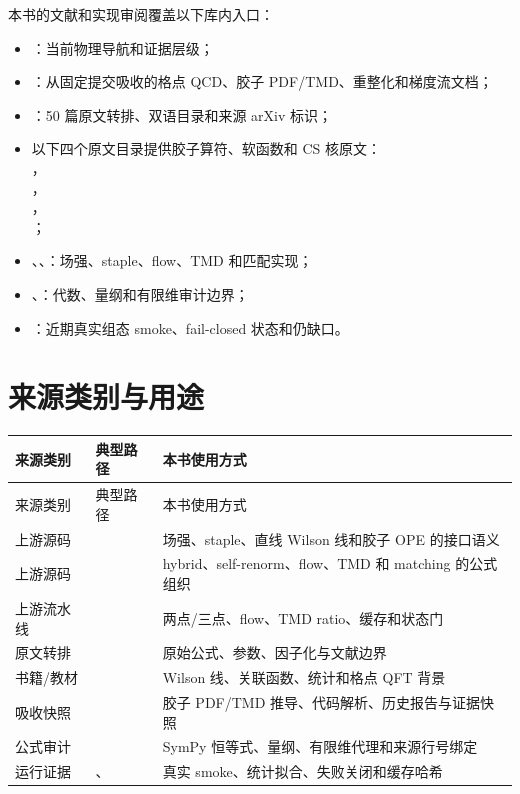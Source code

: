 \documentclass[UTF8,12pt,a4paper,twoside,openany]{ctexbook}
\begin{document}
本书的文献和实现审阅覆盖以下库内入口：
\begin{itemize}
  \item {}：当前物理导航和证据层级；
  \item {}：从固定提交吸收的格点 QCD、胶子 PDF/TMD、重整化和梯度流文档；
  \item {}：50 篇原文转排、双语目录和来源 arXiv 标识；
  \item 以下四个原文目录提供胶子算符、软函数和 CS 核原文：\\
  ，\\
  ，\\
  ，\\
  ；
  \item {}、、：场强、staple、flow、TMD 和匹配实现；
  \item {}、：代数、量纲和有限维审计边界；
  \item {}：近期真实组态 smoke、fail-closed 状态和仍缺口。
\end{itemize}

\section{来源类别与用途}

\begin{longtable}{L{3.0cm}L{4.0cm}L{6.3cm}}
\toprule
来源类别 & 典型路径 & 本书使用方式 \\
\midrule
\endfirsthead
\toprule
来源类别 & 典型路径 & 本书使用方式 \\
\midrule
\endhead
上游源码 &  & 场强、staple、直线 Wilson 线和胶子 OPE 的接口语义 \\
上游源码 &  & hybrid、self-renorm、flow、TMD 和 matching 的公式组织 \\
上游流水线 &  & 两点/三点、flow、TMD ratio、缓存和状态门 \\
原文转排 &  & 原始公式、参数、因子化与文献边界 \\
书籍/教材 &  & Wilson 线、关联函数、统计和格点 QFT 背景 \\
吸收快照 &  & 胶子 PDF/TMD 推导、代码解析、历史报告与证据快照 \\
公式审计 &  & SymPy 恒等式、量纲、有限维代理和来源行号绑定 \\
运行证据 & 、 & 真实 smoke、统计拟合、失败关闭和缓存哈希 \\
\bottomrule
\end{longtable}
\end{document}
